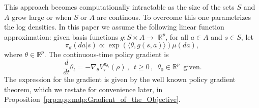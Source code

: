 \documentclass{amsart}
\theoremstyle{definition}
\begin{document}
This approach becomes computationally intractable as the size of the sets $S$ and $A$ grow large or when $S$ or $A$ are continous. 
To overcome this one parametrizes the log densities. 
In this paper we assume the following linear function approximation: given basis functions $g: S \times A \rightarrow$ $\mathbb{R}^p$, for all $a \in A$ and $s \in S$, let
\begin{equation*}
\pi_\theta(da|s) \propto \exp \left(\langle\theta,g(s,a)\rangle\right)\mu(da),
\end{equation*}
where $\theta \in \mathbb{R}^p$. 
The continuous-time policy gradient is 
\begin{equation}\label
{eq:intro:continuous_GF}
\frac{d}{dt}\theta_t = - \nabla_{\theta} V_\tau^{\pi_{\theta_t}}(\rho)\,,\,\,\, t \geq 0\,,\,\,\, \theta_0 \in \mathbb R^p\,\,\,\text{given}.
\end{equation}
The expression for the gradient is given by the well known policy gradient theorem, which we restate for convenience later, in Proposition~\ref{prp:app:mdp:Gradient_of_the_Objective}.
\end{document}
